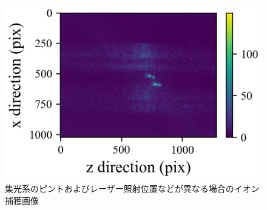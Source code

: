 \begin{figure}[h]
\begin{center}
\begin{minipage}{0.3\linewidth}
	\end{minipage}
	\begin{minipage}{0.3\linewidth}
		\includegraphics[width=0.98\columnwidth]{./theory/figure/5/image_2.jpg}
	\end{minipage}
	\end{center}
	\caption{集光系のピントおよびレーザー照射位置などが異なる場合のイオン捕獲画像}
	\label{fig:ionimage}
\end{figure}

